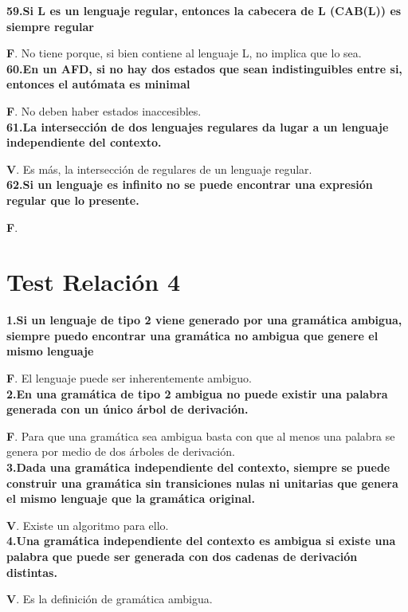 \documentclass[a4paper,11pt]{article}
\begin{document}
\textbf{59.Si L es un lenguaje regular, entonces la cabecera de L (CAB(L)) es siempre regular}

\textbf{F}. No tiene porque, si bien contiene al lenguaje L, no implica que lo sea. \\

\textbf{60.En un AFD, si no hay dos estados que sean indistinguibles entre si, entonces el autómata es minimal}

\textbf{F}. No deben haber estados inaccesibles. \\

\textbf{61.La intersección de dos lenguajes regulares da lugar a un lenguaje independiente del contexto.}

\textbf{V}. Es más, la intersección de regulares de un lenguaje regular. \\

\textbf{62.Si un lenguaje es infinito no se puede encontrar una expresión regular que lo presente.}

\textbf{F}. \\


\section{Test Relación 4}
\textbf{1.Si un lenguaje de tipo 2 viene generado por una gramática ambigua, siempre puedo encontrar una gramática no ambigua que genere el mismo lenguaje}

\textbf{F}. El lenguaje puede ser inherentemente ambiguo. \\

\textbf{2.En una gramática de tipo 2 ambigua no puede existir una palabra generada con un único árbol de derivación.}

\textbf{F}. Para que una gramática sea ambigua basta con que al menos una palabra se genera por medio de dos árboles de derivación. \\

\textbf{3.Dada una gramática independiente del contexto, siempre se puede construir una gramática sin transiciones nulas ni unitarias que genera el mismo lenguaje que la gramática original.}

\textbf{V}. Existe un algoritmo para ello. \\

\textbf{4.Una gramática independiente del contexto es ambigua si existe una palabra que puede ser generada con dos cadenas de derivación distintas.}

\textbf{V}. Es la definición de gramática ambigua. \\
\end{document}
